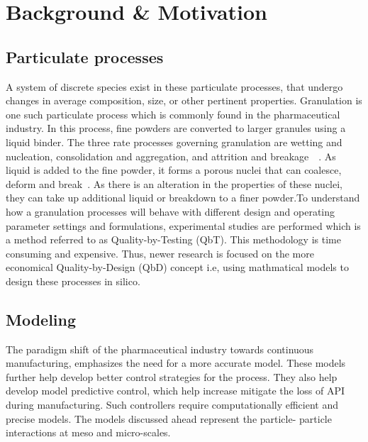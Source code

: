 \documentclass[preprint,11pt,authoryear]{elsarticle}
\begin{document}
\section{Background \& Motivation}

\subsection{Particulate processes}
A system of discrete species exist in these particulate processes, 
that undergo changes in average
composition, size, or other pertinent properties. Granulation is one such
particulate process which is commonly found in the pharmaceutical industry. In
this process, fine powders are converted to larger granules using a liquid
binder. The three rate processes governing granulation are wetting and
nucleation, consolidation and aggregation, and attrition and
breakage~\citep{Iveson2001}~\citep{Cameron2005}. As liquid is added to the
fine powder, it forms a porous nuclei that can coalesce, deform and
break~\citep{Barrasso2015ces}. As there is an alteration in the properties of
these nuclei, they can take up additional liquid or breakdown to a finer
powder.To understand how a granulation processes will behave with different
design and operating parameter settings and formulations, experimental studies
are performed which is a method referred to as Quality-by-Testing (QbT). This
methodology is time consuming and expensive. Thus, newer research is focused
on the more economical Quality-by-Design (QbD) concept i.e, using mathmatical 
models to design these processes in silico.

\subsection{Modeling}
The paradigm shift of the pharmaceutical industry towards continuous 
manufacturing, emphasizes the need for a more accurate model. These models
further help develop better control strategies for the process. 
They also help develop model predictive control, which help increase mitigate the 
loss of API during manufacturing. Such controllers require computationally 
efficient and precise models. The models discussed ahead represent the particle-
particle interactions at meso and micro-scales.
\end{document}

